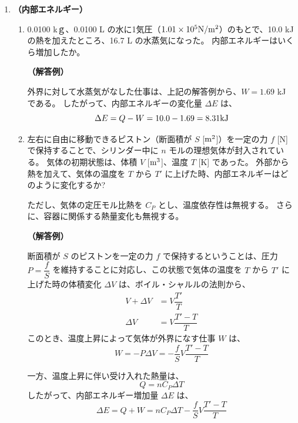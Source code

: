 \documentclass[uplatex,dvipdfmx,a4paper,11pt]{jsarticle}
\begin{document}
\begin{appendix}
\begin{enumerate}
\begin{enumerate}
\end{enumerate}


\item
{\bf （内部エネルギー）}

\begin{enumerate}
\item
0.0100 kｇ、0.0100 L の水に1気圧（$1.01 \times 10^5 {\rm N}/{\rm m}^2$）のもとで、10.0 kJ の熱を加えたところ、16.7 L の水蒸気になった。
内部エネルギーはいくら増加したか。

{\bf （解答例）}

外界に対して水蒸気がなした仕事は、上記の解答例から、$W=1.69$ kJ である。
したがって、内部エネルギーの変化量 $\Delta E$ は、
\begin{equation*}
\Delta E = Q - W = 10.0 - 1.69 = 8.31 {\rm kJ}
\end{equation*}

\item
左右に自由に移動できるピストン（断面積が $S$ [${\rm m}^2$]）を一定の力 $f$ [N] で保持することで、シリンダー中に $n$ モルの理想気体が封入されている。
気体の初期状態は、体積 $V$ [${\rm m}^3$]、温度 $T$ [K] であった。
外部から熱を加えて、気体の温度を $T$ から $T'$ に上げた時、内部エネルギーはどのように変化するか?

ただし、気体の定圧モル比熱を $C_P$ とし、温度依存性は無視する。
さらに、容器に関係する熱量変化も無視する。

{\bf （解答例）}

断面積が $S$ のピストンを一定の力 $f$ で保持するということは、圧力 $P= \dfrac{f}{S}$ を維持することに対応し、この状態で気体の温度を $T$ から $T'$ に上げた時の体積変化 $\Delta V$ は、ボイル・シャルルの法則から、
\begin{align*}
V + \Delta V &= V \dfrac{T'}{T} \\
\Delta V &= V\dfrac{T' - T}{T} 
\end{align*}
このとき、温度上昇によって気体が外界になす仕事 $W$ は、
\begin{equation*}
W = -P\Delta V =- \dfrac{f}{S} V\dfrac{T' - T}{T}
\end{equation*}

一方、温度上昇に伴い受け入れた熱量は、
\begin{equation*}
Q = n C_P \Delta T
\end{equation*}
したがって、内部エネルギー増加量 $\Delta E$ は、
\begin{equation*}
\Delta E = Q + W = n C_P \Delta T - \dfrac{f}{S} V\dfrac{T' - T}{T}
\end{equation*}


\end{enumerate}
\end{enumerate}
\end{appendix}
\end{document}
